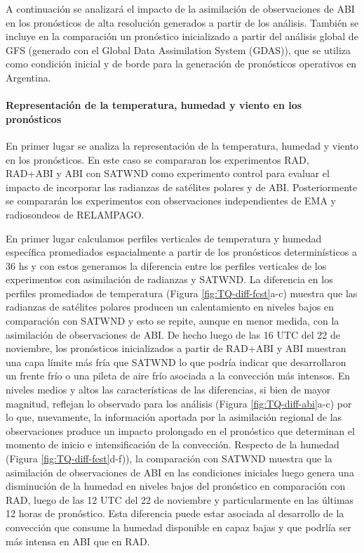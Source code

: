 \documentclass[12pt,oneside,a4paper]{reedthesis}
\begin{document}
A continuación se analizará el impacto de la asimilación de observaciones de ABI en los pronósticos de alta resolución generados a partir de los análisis. También se incluye en la comparación un pronóstico inicializado a partir del análisis global de GFS (generado con el Global Data Assimilation System (GDAS)), que se utiliza como condición inicial y de borde para la generación de pronósticos operativos en Argentina.

\hypertarget{representaciuxf3n-de-la-temperatura-humedad-y-viento-en-los-pronuxf3sticos}{%
\paragraph{Representación de la temperatura, humedad y viento en los pronósticos}\label{representaciuxf3n-de-la-temperatura-humedad-y-viento-en-los-pronuxf3sticos}}

En primer lugar se analiza la representación de la temperatura, humedad y viento en los pronósticos. En este caso se compararan los experimentos RAD, RAD+ABI y ABI con SATWND como experimento control para evaluar el impacto de incorporar las radianzas de satélites polares y de ABI. Posteriormente se compararán los experimentos con observaciones independientes de EMA y radiosondeos de RELAMPAGO.

En primer lugar calculamos perfiles verticales de temperatura y humedad específica promediados espacialmente a partir de los pronósticos determinísticos a 36 hs y con estos generamos la diferencia entre los perfiles verticales de los experimentos con asimilación de radianzas y SATWND. La diferencia en los perfiles promediados de temperatura (Figura \ref{fig:TQ-diff-fcst}a-c) muestra que las radianzas de satélites polares producen un calentamiento en niveles bajos en comparación con SATWND y esto se repite, aunque en menor medida, con la asimilación de observaciones de ABI. De hecho luego de las 16 UTC del 22 de noviembre, los pronósticos inicializados a partir de RAD+ABI y ABI muestran una capa límite más fría que SATWND lo que podría indicar que desarrollaron un frente frío o una pileta de aire frío asociada a la convección más intensos. En niveles medios y altos las características de las diferencias, si bien de mayor magnitud, reflejan lo observado para los análisis (Figura \ref{fig:TQ-diff-abi}a-c) por lo que, nuevamente, la información aportada por la asimilación regional de las observaciones produce un impacto prolongado en el pronóstico que determinan el momento de inicio e intensificación de la convección. Respecto de la humedad (Figura \ref{fig:TQ-diff-fcst}d-f)), la comparación con SATWND muestra que la asimilación de observaciones de ABI en las condiciones iniciales luego genera una disminución de la humedad en niveles bajos del pronóstico en comparación con RAD, luego de las 12 UTC del 22 de noviembre y particularmente en las últimas 12 horas de pronóstico. Esta diferencia puede estar asociada al desarrollo de la convección que consume la humedad disponible en capaz bajas y que podrlía ser más intensa en ABI que en RAD.
\end{document}
